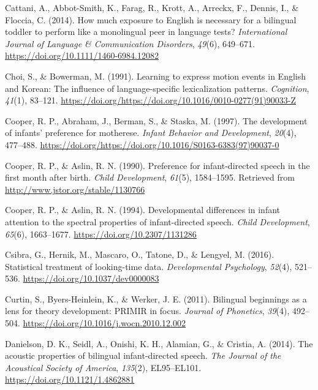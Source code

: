 \documentclass[,man,floatsintext]{apa6}
\begin{document}
\leavevmode\hypertarget{ref-cattani_2014}{}%
Cattani, A., Abbot-Smith, K., Farag, R., Krott, A., Arreckx, F., Dennis, I., \& Floccia, C. (2014). How much exposure to English is necessary for a bilingual toddler to perform like a monolingual peer in language tests? \emph{International Journal of Language \& Communication Disorders}, \emph{49}(6), 649--671. \url{https://doi.org/10.1111/1460-6984.12082}

\leavevmode\hypertarget{ref-choi_1991}{}%
Choi, S., \& Bowerman, M. (1991). Learning to express motion events in English and Korean: The influence of language-specific lexicalization patterns. \emph{Cognition}, \emph{41}(1), 83--121. \url{https://doi.org/https://doi.org/10.1016/0010-0277(91)90033-Z}

\leavevmode\hypertarget{ref-cooper_1997}{}%
Cooper, R. P., Abraham, J., Berman, S., \& Staska, M. (1997). The development of infants' preference for motherese. \emph{Infant Behavior and Development}, \emph{20}(4), 477--488. \url{https://doi.org/https://doi.org/10.1016/S0163-6383(97)90037-0}

\leavevmode\hypertarget{ref-cooper_1990}{}%
Cooper, R. P., \& Aslin, R. N. (1990). Preference for infant-directed speech in the first month after birth. \emph{Child Development}, \emph{61}(5), 1584--1595. Retrieved from \url{http://www.jstor.org/stable/1130766}

\leavevmode\hypertarget{ref-cooper_1994}{}%
Cooper, R. P., \& Aslin, R. N. (1994). Developmental differences in infant attention to the spectral properties of infant-directed speech. \emph{Child Development}, \emph{65}(6), 1663--1677. \url{https://doi.org/10.2307/1131286}

\leavevmode\hypertarget{ref-csibra_2016}{}%
Csibra, G., Hernik, M., Mascaro, O., Tatone, D., \& Lengyel, M. (2016). Statistical treatment of looking-time data. \emph{Developmental Psychology}, \emph{52}(4), 521--536. \url{https://doi.org/10.1037/dev0000083}

\leavevmode\hypertarget{ref-curtin_2011}{}%
Curtin, S., Byers-Heinlein, K., \& Werker, J. E. (2011). Bilingual beginnings as a lens for theory development: PRIMIR in focus. \emph{Journal of Phonetics}, \emph{39}(4), 492--504. \url{https://doi.org/10.1016/j.wocn.2010.12.002}

\leavevmode\hypertarget{ref-danielson_2014}{}%
Danielson, D. K., Seidl, A., Onishi, K. H., Alamian, G., \& Cristia, A. (2014). The acoustic properties of bilingual infant-directed speech. \emph{The Journal of the Acoustical Society of America}, \emph{135}(2), EL95--EL101. \url{https://doi.org/10.1121/1.4862881}
\end{document}
